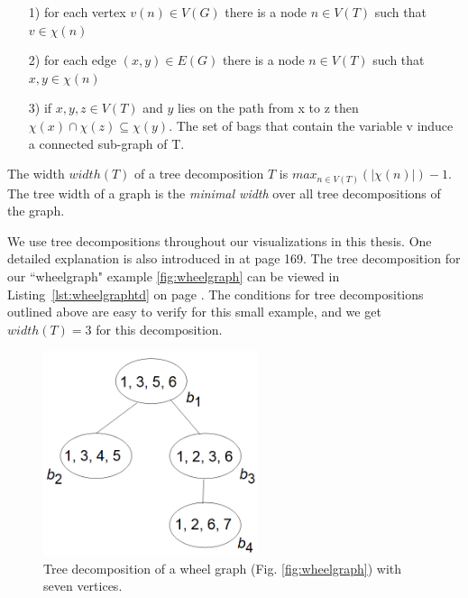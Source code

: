 \documentclass[a4paper, 12pt, bibliography=totoc]{scrartcl}
\begin{document}
\begin{itemize}
	\item[1)] for each vertex $v(n) \in V(G)$ there is a node $n \in V(T)$ such that $v \in \chi(n)$
	\item[2)] for each edge $(x,y) \in E(G)$ there is a node $n\in V(T)$ such that $x,y \in\chi(n)$
	\item[3)] if $x,y,z \in V(T)$ and $y$ lies on the path from x to z then $\chi(x) \cap \chi(z) \subseteq \chi(y)$. The set of bags that contain the variable v induce a connected sub-graph of T.
\end{itemize}
The width $width(T)$ of a tree decomposition $T$ is $max_{n\in V(T)}(|\chi(n)|)-1$.
The tree width of a graph is the \textit{minimal width} over all tree decompositions of the graph. 


We use tree decompositions throughout our visualizations in this thesis. One detailed explanation is also introduced in \cite{pcgp2019} at page 169.
The tree decomposition for our ``wheelgraph" example \ref{fig:wheelgraph} can be viewed in Listing~\ref{lst:wheelgraphtd} on page \pageref{lst:wheelgraphtd}. The conditions for tree decompositions outlined above are easy to verify for this small example, and we get  $width(T)=3$ for this decomposition.
\begin{figure}[h]
	\centering
	\includegraphics[height=6cm]{images/TDWheelgraph7.png}
		\caption[Tree decomposition of the wheel graph]{Tree decomposition of a wheel graph (Fig. \ref{fig:wheelgraph})	with seven vertices.}
	\label{fig:tdweelgraph7}
\end{figure}
\end{document}
